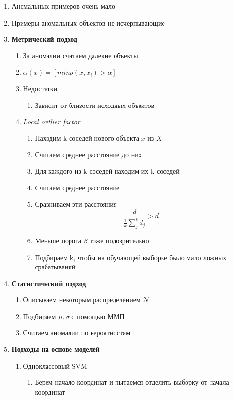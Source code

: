 \documentclass[a4paper, 12pt]{article}
\begin{document}
\begin{enumerate}
  \item Аномальных примеров очень мало
  \item Примеры аномальных объектов не исчерпывающие
  \item \textbf{Метрический подход}
  \begin{enumerate}
    \item За аномалии считаем далекие объекты
    \item $\alpha(x) = [min \rho(x, x_i) > \alpha ]$
    \item Недостатки
    \begin{enumerate}
      \item Зависит от близости исходных объектов
    \end{enumerate}
    \item \textit{Local outlier factor}
    \begin{enumerate}
      \item Находим k соседей нового объекта $x$ из $X$
      \item Считаем среднее расстояние до них
      \item Для каждого из k соседей находим их k соседей
      \item Считаем среднее расстояние
      \item Сравниваем эти расстояния
      \[\frac{d}{\frac{1}{k}\sum_j^k d_j} > d\]
      \item Меньше порога $\beta$ тоже подозрительно
      \item Подбираем k, чтобы на обучающей выборке было мало ложных срабатываний
    \end{enumerate}
  \end{enumerate}
  \item \textbf{Статистический подход}
  \begin{enumerate}
    \item Описываем некоторым распределением $\mathcal{N}$
    \item Подбираем $\mu, \sigma$ с помощью ММП
    \item Считаем аномалии по вероятностям
  \end{enumerate}
  \item \textbf{Подходы на основе моделей}
  \begin{enumerate}
    \item Одноклассовый SVM
    \begin{enumerate}
      \item Берем начало координат и пытаемся отделить выборку от начала координат

\end{enumerate}
\end{enumerate}
\end{enumerate}
\end{document}
